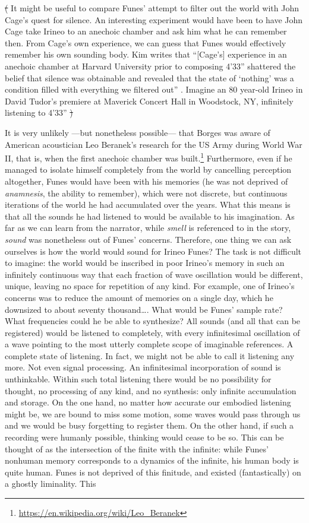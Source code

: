\sout{(} It might be useful to compare Funes' attempt to filter out the world with John Cage's quest for silence. An interesting experiment would have been to have John Cage take Irineo to an anechoic chamber and ask him what he can remember then. From Cage's own experience, we can guess that Funes would effectively remember his own sounding body. Kim \textcite{Cas00:The} writes that ``[Cage's] experience in an anechoic chamber at Harvard University prior to composing 4'33'' shattered the belief that silence was obtainable and revealed that the state of `nothing' was a condition filled with everything we filtered out'' \parencite[14]{Cas00:The}. Imagine an 80 year-old Irineo in David Tudor's premiere at Maverick Concert Hall in Woodstock, NY, infinitely listening to 4'33'' \sout{)}

It is very unlikely ---but nonetheless possible--- that Borges was aware of American acoustician Leo Beranek's research for the US Army during World War II, that is, when the first anechoic chamber was built.\footnote{\url{https://en.wikipedia.org/wiki/Leo_Beranek}} Furthermore, even if he managed to isolate himself completely from the world by cancelling perception altogether, Funes would have been with his memories (he was not deprived of \textit{anamnesis}, the ability to remember), which were not discrete, but continuous iterations of the world he had accumulated over the years. What this means is that all the sounds he had listened to would be available to his imagination. As far as we can learn from the narrator, while \textit{smell} is referenced to in the story, \textit{sound} was nonetheless out of Funes' concerns. Therefore, one thing we can ask ourselves is how the world would sound for Irineo Funes? The task is not difficult to imagine: the world would be inscribed in poor Irineo's memory in such an infinitely continuous way that each fraction of wave oscillation would be different, unique, leaving no space for repetition of any kind. For example, one of Irineo's concerns was to reduce the amount of memories on a single day, which he downsized to about seventy thousand\dots. What would be Funes' sample rate? What frequencies could he be able to synthesize? All sounds (and all that can be registered) would be listened to completely, with every infinitesimal oscillation of a wave pointing to the most utterly complete scope of imaginable references. A complete state of listening. In fact, we might not be able to call it listening any more. Not even signal processing. An infinitesimal incorporation of sound is unthinkable. Within such total listening there would be no possibility for thought, no processing of any kind, and no synthesis: only infinite accumulation and storage. On the one hand, no matter how accurate our embodied listening might be, we are bound to miss some motion, some waves would pass through us and we would be busy forgetting to register them. On the other hand, if such a recording were humanly possible, thinking would cease to be so. This can be thought of as the intersection of the finite with the infinite: while Funes' nonhuman memory corresponds to a dynamics of the infinite, his human body is quite human. Funes is not deprived of this finitude, and existed (fantastically) on a ghostly liminality. This 